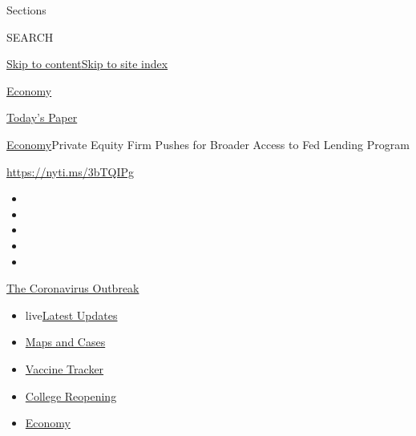 Sections

SEARCH

\protect\hyperlink{site-content}{Skip to
content}\protect\hyperlink{site-index}{Skip to site index}

\href{https://www.nytimes.com/section/business/economy}{Economy}

\href{https://myaccount.nytimes.com/auth/login?response_type=cookie\&client_id=vi}{}

\href{https://www.nytimes.com/section/todayspaper}{Today's Paper}

\href{/section/business/economy}{Economy}\textbar{}Private Equity Firm
Pushes for Broader Access to Fed Lending Program

\url{https://nyti.ms/3bTQIPg}

\begin{itemize}
\item
\item
\item
\item
\item
\end{itemize}

\href{https://www.nytimes.com/news-event/coronavirus?action=click\&pgtype=Article\&state=default\&region=TOP_BANNER\&context=storylines_menu}{The
Coronavirus Outbreak}

\begin{itemize}
\tightlist
\item
  live\href{https://www.nytimes.com/2020/08/03/world/coronavirus-covid-19.html?action=click\&pgtype=Article\&state=default\&region=TOP_BANNER\&context=storylines_menu}{Latest
  Updates}
\item
  \href{https://www.nytimes.com/interactive/2020/us/coronavirus-us-cases.html?action=click\&pgtype=Article\&state=default\&region=TOP_BANNER\&context=storylines_menu}{Maps
  and Cases}
\item
  \href{https://www.nytimes.com/interactive/2020/science/coronavirus-vaccine-tracker.html?action=click\&pgtype=Article\&state=default\&region=TOP_BANNER\&context=storylines_menu}{Vaccine
  Tracker}
\item
  \href{https://www.nytimes.com/2020/08/02/us/covid-college-reopening.html?action=click\&pgtype=Article\&state=default\&region=TOP_BANNER\&context=storylines_menu}{College
  Reopening}
\item
  \href{https://www.nytimes.com/live/2020/08/03/business/stock-market-today-coronavirus?action=click\&pgtype=Article\&state=default\&region=TOP_BANNER\&context=storylines_menu}{Economy}
\end{itemize}

